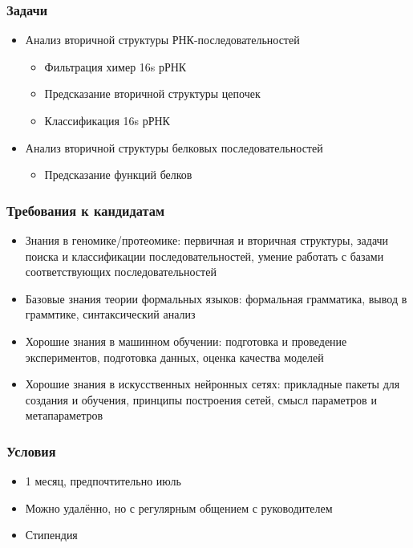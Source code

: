 \documentclass[xcolor=table]{beamer}
\begin{document}
\begin{frame} \frametitle{Задачи}
   \begin{itemize}
      \item Анализ вторичной структуры РНК-последовательностей
      \begin{itemize}
        \item Фильтрация химер 16s рРНК
        \item Предсказание вторичной структуры цепочек
        \item Классификация 16s рРНК
      \end{itemize}
      \pause
      \item Анализ вторичной структуры белковых последовательностей
      \begin{itemize}
        \item Предсказание функций белков
      \end{itemize}
    \end{itemize}
\end{frame}

\begin{frame} \frametitle{Требования к кандидатам}
   \begin{itemize}
      \item Знания в геномике/протеомике: первичная и вторичная структуры, задачи поиска и классификации последовательностей, умение работать с базами соответствующих последовательностей
      \item Базовые знания теории формальных языков: формальная грамматика, вывод в граммтике, синтаксический анализ 
      \item Хорошие знания в машинном обучении: подготовка и проведение экспериментов, подготовка данных, оценка качества моделей
      \item Хорошие знания в искусственных нейронных сетях: прикладные пакеты для создания и обучения, принципы построения сетей, смысл параметров и метапараметров
    \end{itemize}
\end{frame}


\begin{frame} \frametitle{Условия}
   \begin{itemize}
      \item 1 месяц, предпочтительно июль
      \item Можно удалённо, но с регулярным общением с руководителем
      \item Стипендия
    \end{itemize}
\end{frame}
\end{document}
